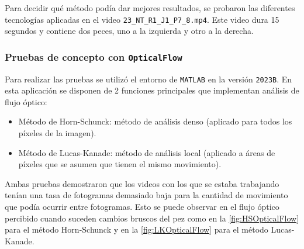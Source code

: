 \vspace{1\baselineskip}
Para decidir qué método podía dar mejores resultados, se probaron las diferentes tecnologías aplicadas en el video \verb|23_NT_R1_J1_P7_8.mp4|. Este video dura 15 segundos y contiene dos peces, uno a 
la izquierda y otro a la derecha.

\clearpage
\subsubsection{Pruebas de concepto con \texttt{OpticalFlow}}

Para realizar las pruebas se utilizó el entorno de \texttt{MATLAB} en la versión \texttt{2023B}. En esta aplicación se disponen de 2 funciones principales 
que implementan análisis de flujo óptico: 
\begin{itemize}
    \item Método de Horn-Schunck: método de análisis denso (aplicado para todos los píxeles de la imagen).
    \item Método de Lucas-Kanade: método de análisis local (aplicado a áreas de píxeles que se asumen que tienen el mismo movimiento).
\end{itemize}

Ambas pruebas demostraron que los videos con los que se estaba trabajando tenían una tasa de fotogramas demasiado baja para la cantidad de movimiento que podía ocurrir entre fotogramas. 
Esto se puede observar en el flujo óptico percibido cuando suceden cambios bruscos del pez como en la \autoref{fig:HSOpticalFlow} para el método Horn-Schunck y en la \autoref{fig:LKOpticalFlow} 
para el método Lucas-Kanade.

